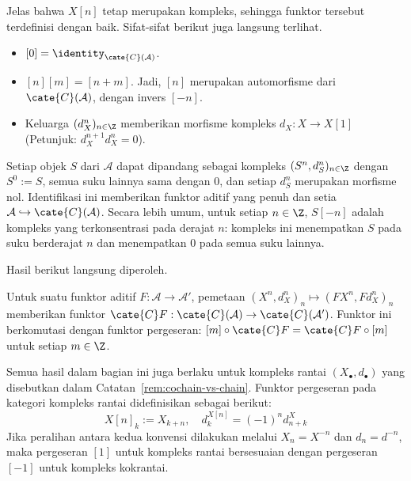 Jelas bahwa $X[n]$ tetap merupakan kompleks, sehingga funktor tersebut
terdefinisi dengan baik. Sifat-sifat berikut juga langsung terlihat.
\begin{itemize}
	\item $[0]=\identity_{\cate{C}(\mathcal{A})}$.
	\item $[n][m]=[n+m]$. Jadi, $[n]$ merupakan automorfisme dari
	$\cate{C}(\mathcal{A})$, dengan invers $[-n]$.
	\item Keluarga $(d_X^n)_{n\in\Z}$ memberikan morfisme kompleks
	$d_X:X\to X[1]$ (Petunjuk: $d_X^{n+1}d_X^n=0$).
\end{itemize}

\begin{konvensi}\label{con:concentrated-cplx}
	Setiap objek $S$ dari $\mathcal{A}$ dapat dipandang sebagai kompleks
	$(S^n,d_S^n)_{n\in\Z}$ dengan $S^0:=S$, semua suku lainnya sama dengan
	$0$, dan setiap $d_S^n$ merupakan morfisme nol. Identifikasi ini memberikan
	funktor aditif yang penuh dan setia
	$\mathcal{A}\hookrightarrow\cate{C}(\mathcal{A})$. Secara lebih umum,
	untuk setiap $n\in\Z$, $S[-n]$ adalah kompleks yang terkonsentrasi pada
	derajat $n$: kompleks ini menempatkan $S$ pada suku berderajat $n$ dan
	menempatkan $0$ pada semua suku lainnya.
\end{konvensi}

Hasil berikut langsung diperoleh.

\begin{proposisi}\label{prop:CA-functoriality}
	Untuk suatu funktor aditif $F:\mathcal{A}\to\mathcal{A}'$, pemetaan
	$(X^n,d_X^n)_n\mapsto(FX^n,Fd_X^n)_n$ memberikan funktor
	$\cate{C}F:\cate{C}(\mathcal{A})\to\cate{C}(\mathcal{A}')$. Funktor ini
	berkomutasi dengan funktor pergeseran:
	$[m]\circ\cate{C}F=\cate{C}F\circ[m]$ untuk setiap $m\in\Z$.
\end{proposisi}

\begin{catatan}\label{rem:chain-cplx-translation}
	\index[sym1]{[n]}
	Semua hasil dalam bagian ini juga berlaku untuk kompleks rantai
	$(X_\bullet,d_\bullet)$ yang disebutkan dalam
	Catatan~\ref{rem:cochain-vs-chain}. Funktor pergeseran pada kategori kompleks
	rantai didefinisikan sebagai berikut:
	\[ X[n]_k:=X_{k+n},\quad d^{X[n]}_k=(-1)^nd^X_{n+k} \]
	Jika peralihan antara kedua konvensi dilakukan melalui $X_n=X^{-n}$ dan
	$d_n=d^{-n}$, maka pergeseran $[1]$ untuk kompleks rantai bersesuaian dengan
	pergeseran $[-1]$ untuk kompleks kokrantai.
\end{catatan}
